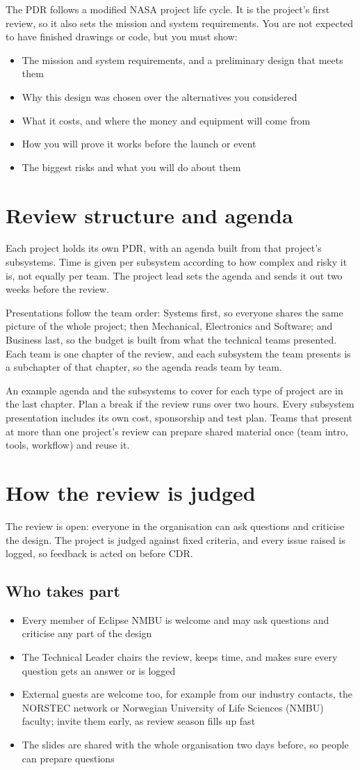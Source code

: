 \documentclass{../../Common/Latex/Templates/rapport}
\renewcommand{\vsection}[1]{\section{#1}}
\renewcommand{\vsubsection}[1]{\subsection{#1}}
\begin{document}
The PDR follows a modified NASA project life cycle. It is the project's first review, so it also sets the mission and system requirements. You are not expected to have finished drawings or code, but you must show:
\begin{itemize}
  \item The mission and system requirements, and a preliminary design that meets them
  \item Why this design was chosen over the alternatives you considered
  \item What it costs, and where the money and equipment will come from
  \item How you will prove it works before the launch or event
  \item The biggest risks and what you will do about them
\end{itemize}

\vsection{Review structure and agenda}
Each project holds its own PDR, with an agenda built from that project's subsystems. Time is given per subsystem according to how complex and risky it is, not equally per team. The project lead sets the agenda and sends it out two weeks before the review.

Presentations follow the team order: Systems first, so everyone shares the same picture of the whole project; then Mechanical, Electronics and Software; and Business last, so the budget is built from what the technical teams presented. Each team is one chapter of the review, and each subsystem the team presents is a subchapter of that chapter, so the agenda reads team by team.

An example agenda and the subsystems to cover for each type of project are in the last chapter. Plan a break if the review runs over two hours. Every subsystem presentation includes its own cost, sponsorship and test plan. Teams that present at more than one project's review can prepare shared material once (team intro, tools, workflow) and reuse it.

\vsection{How the review is judged}
The review is open: everyone in the organisation can ask questions and criticise the design. The project is judged against fixed criteria, and every issue raised is logged, so feedback is acted on before CDR.

\vsubsection{Who takes part}
\begin{itemize}
  \item Every member of Eclipse NMBU is welcome and may ask questions and criticise any part of the design
  \item The Technical Leader chairs the review, keeps time, and makes sure every question gets an answer or is logged
  \item External guests are welcome too, for example from our industry contacts, the NORSTEC network or Norwegian University of Life Sciences (NMBU) faculty; invite them early, as review season fills up fast
  \item The slides are shared with the whole organisation two days before, so people can prepare questions
\end{itemize}
\end{document}
